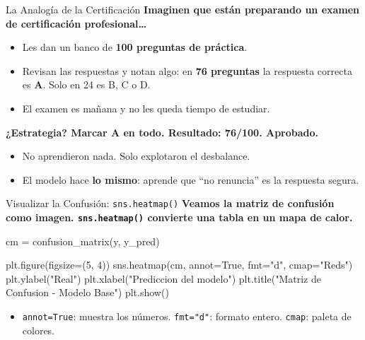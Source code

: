 \documentclass[aspectratio=169, 11pt]{beamer}
\begin{document}
\begin{frame}{La Analogía de la Certificación}
  \vspace{-4pt}
  {\footnotesize\color{arcaDark}\bfseries
    Imaginen que están preparando un examen de certificación
    profesional\ldots}

  \vspace{6pt}
  {\footnotesize
  \begin{itemize}\setlength{\itemsep}{6pt}
    \item[{\color{arcaRed}\scriptsize\faArrowRight}]
      Les dan un banco de \textbf{100 preguntas de práctica}.
    \item[{\color{arcaRed}\scriptsize\faArrowRight}]
      Revisan las respuestas y notan algo: en \textbf{76 preguntas}
      la respuesta correcta es \textbf{A}. Solo en 24 es B, C o D.
    \item[{\color{arcaRed}\scriptsize\faArrowRight}]
      El examen es mañana y no les queda tiempo de estudiar.
  \end{itemize}
  }

  \vspace{6pt}
  {\footnotesize\color{arcaDark}\bfseries
    ¿Estrategia? Marcar \textbf{A en todo}. Resultado: 76/100.
    Aprobado.}

  \vspace{6pt}
  {\footnotesize
  \begin{itemize}\setlength{\itemsep}{3pt}
    \item[{\color{codeOrange}\scriptsize\faExclamationTriangle}]
      No aprendieron nada. Solo explotaron el desbalance.
    \item[{\color{codeOrange}\scriptsize\faExclamationTriangle}]
      El modelo hace \textbf{lo mismo}: aprende que
      ``no renuncia'' es la respuesta segura.
  \end{itemize}
  }
\end{frame}

\begin{frame}[fragile,shrink=28]{Visualizar la Confusión: \texttt{sns.heatmap()}}
  \vspace{-6pt}
  {\footnotesize\color{arcaDark}\bfseries
    Veamos la matriz de confusión como imagen.
    \texttt{sns.heatmap()} convierte una tabla en un mapa de calor.}

  \vspace{4pt}
  \begin{pyblock}
cm = confusion_matrix(y, y_pred)

plt.figure(figsize=(5, 4))
sns.heatmap(cm, annot=True, fmt="d", cmap="Reds")
plt.ylabel("Real")
plt.xlabel("Prediccion del modelo")
plt.title("Matriz de Confusion - Modelo Base")
plt.show()
  \end{pyblock}

  \vspace{4pt}
  {\scriptsize\color{textMuted}
  \begin{itemize}\setlength{\itemsep}{3pt}
    \item[{\color{arcaRed}\scriptsize\faArrowRight}]
      \texttt{annot=True}: muestra los números.
      \texttt{fmt="d"}: formato entero.
      \texttt{cmap}: paleta de colores.
  \end{itemize}
  }
\end{frame}
\end{document}
